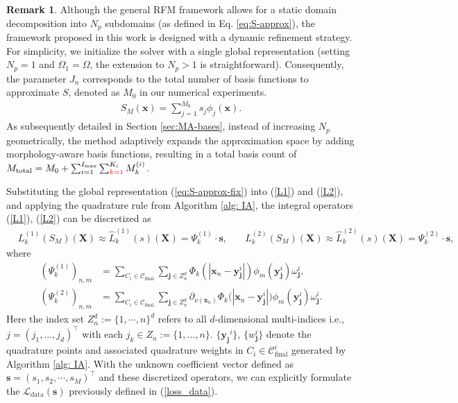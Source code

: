 \documentclass{article}
\newcommand{\red}[1]{\textcolor{red}{#1}}
\theoremstyle{plain}
\theoremstyle{definition}
\newtheorem{remark}{\textbf{Remark}}
\begin{document}
\begin{remark} 
{
\label{rem:partition_strategy}
Although the general RFM framework allows for a static domain decomposition into $N_p$ subdomains (as defined in Eq. \eqref{eq:S-approx}), the framework proposed in this work is designed with a dynamic refinement strategy. 
For simplicity, we initialize the solver with a single global representation (setting $N_p=1$ and $\Omega_1 = \Omega$, the extension to $N_p>1$ is straightforward). Consequently, the parameter $J_{n}$ corresponds to the  total number of basis functions to approximate $S$, denoted as $M_0$ in our numerical experiments. 
\begin{align} \label{eq:S-approx-fix}
S_{M}(\boldsymbol{x})=\sum_{j=1}^{M_0}s_{j}\phi_{j}(\boldsymbol{x}).
\end{align}
As subsequently detailed in Section \ref{sec:MA-bases}, instead of increasing $N_p$ geometrically, the method adaptively expands the approximation space by adding morphology-aware basis functions, resulting in a total basis count of $M_{\text{total}} = M_0 + \sum_{i=1}^{I_{\text{max}}} \sum_{\red{k=1}}^{K_i} M_k^{(i)}$.
}
\end{remark}

 {Substituting the global representation (\ref{eq:S-approx-fix}) into (\ref{L1}) and (\ref{L2}), and applying the quadrature rule from Algorithm \ref{alg: IA}, the integral operators (\ref{L1}), (\ref{L2}) can be discretized as}
\begin{align}
    \label{matrix1}
    &L_k^{(1)}(S_M)(\boldsymbol{X})\approx \hat{L}_k^{(1)}(s)(\boldsymbol{X})=\Psi_k ^{(1)} \cdot \boldsymbol{s},  
    \quad 
    &L_k^{(2)}(S_M)(\boldsymbol{X})\approx \hat{L}_k^{(2)}(s)(\boldsymbol{X})=\Psi_k ^{(2)} \cdot \boldsymbol{s},
\end{align}
where
\begin{align}
(\Psi_k^{(1)})_{n,m} &=\sum_{ {C_i \in \mathcal{C}_{\text{final}}}}\sum_{\mathbf{j}\in  {Z_n^d}}\Phi_k\left(|\mathbf{x}_n-\mathbf{y}_\mathbf{j}^i|\right)\phi_m(\mathbf{y}_\mathbf{j}^i)\omega_\mathbf{j}^i,\\
(\Psi_k^{(2)})_{n,m} &=\sum_{ {C_i \in \mathcal{C}_{\text{final}}}}\sum_{\mathbf{j}\in  {Z_n^d}} 
{\partial_{\nu(\mathbf{x}_n)}\Phi_k\bigl(|\mathbf{x}_n-\mathbf{y}_\mathbf{j}^i|\bigr)}\phi_m(\mathbf{y}_\mathbf{j}^i)\omega_\mathbf{j}^i.
\end{align}
 {Here the index set $Z_n^d:=\{1,\cdots,n\}^d$ refers to all $d$-dimensional multi-indices i.e., $j = (j_1,\dots,j_d)^\top$ with each $j_k \in Z_n :=\{1,\dots,n\}$.}  {$\{ \mathbf{y_j}^i \}$, $\{ w^i_\mathbf{j} \}$ denote the quadrature points and associated quadrature weights  in $C_i \in \mathcal{C}_{\text{final}}^i$ generated by Algorithm \ref{alg: IA}}.  {With the unknown coefficient vector defined as $\boldsymbol{s}=(s_1, s_2, \cdots, s_M)^\top$ and these discretized operators, we can explicitly formulate the $\mathcal{L}_{\text{data}}(\boldsymbol{s})$  previously defined in (\ref{loss_data}).}
\end{document}
